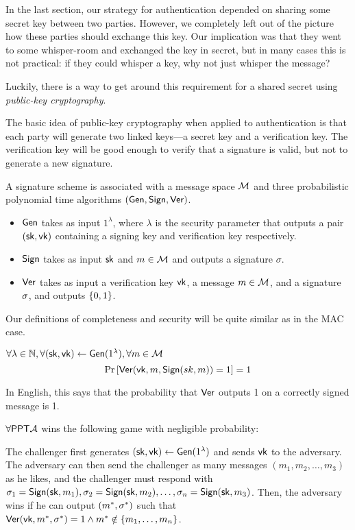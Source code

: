 In the last section, our strategy for authentication depended on sharing some secret key between two parties. However, we completely left out of the picture how these parties should exchange this key. Our implication was that they went to some whisper-room and exchanged the key in secret, but in many cases this is not practical: if they could whisper a key, why not just whisper the message?

Luckily, there is a way to get around this requirement for a shared secret using \emph{public-key cryptography}. %

The basic idea of public-key cryptography when applied to authentication is that each party will generate two linked keys---a secret key and a verification key. The verification key will be good enough to verify that a signature is valid, but not to generate a new signature.

\begin{definition}
	A signature scheme is associated with a message space $\mathcal{M}$ and three probabilistic polynomial time algorithms $(\mathsf{Gen}, \mathsf{Sign}, \mathsf{Ver})$.

	\begin{itemize}
		\item $\mathsf{Gen}$ takes as input $1^\lambda$, where $\lambda$ is the security parameter that outputs a pair $({\mathsf{sk}}, \mathsf{vk})$ containing a signing key and verification key respectively.
		\item $\mathsf{Sign}$ takes as input ${\mathsf{sk}}$ and $m \in \mathcal{M}$ and outputs a signature $\sigma$.
	\item $\mathsf{Ver}$ takes as input a verification key $\mathsf{vk}$, a message $m \in \mathcal{M}$, and a signature $\sigma$, and outputs $\{0,1\}$.
	\end{itemize}
	
\end{definition}

Our definitions of completeness and security will be quite similar as in the MAC case.

\begin{definition}[Completeness]
	$\forall \lambda \in \mathbb{N}, \forall ({\mathsf{sk}}, \mathsf{vk}) \leftarrow \mathsf{Gen}(1^\lambda), \forall m \in \mathcal{M}$
  \[ \text{Pr}\left[\mathsf{Ver}(\mathsf{vk}, m, \mathsf{Sign}(sk, m)) = 1\right] = 1 \]

	In English, this says that the probability that $\mathsf{Ver}$ outputs 1 on a correctly signed message is 1.
\end{definition}

\begin{definition}[Security]
	$\forall \mathsf{PPT} \mathcal{A}$ wins the following game with negligible probability:

	The challenger first generates $({\mathsf{sk}}, \mathsf{vk}) \leftarrow \mathsf{Gen}(1^\lambda)$ and sends $\mathsf{vk}$ to the adversary. The adversary can then send the challenger as many messages $(m_1, m_2, \ldots, m_3)$ as he likes, and the challenger must respond with $\sigma_1 = \mathsf{Sign}({\mathsf{sk}}, m_1), \sigma_2 = \mathsf{Sign}({\mathsf{sk}}, m_2), \ldots, \sigma_n = \mathsf{Sign}({\mathsf{sk}}, m_3)$. Then, the adversary wins if he can output $(m^*, \sigma^*)$ such that $\mathsf{Ver}(\mathsf{vk}, m^*, \sigma^*) = 1 \land m^* \notin \left\{ m_1, \ldots, m_n \right\}$. %
\end{definition}

